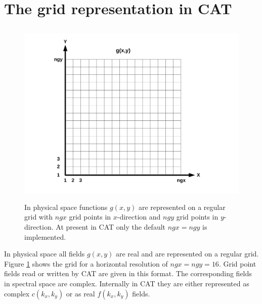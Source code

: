 \section{The grid representation in CAT}
\label{ssec_Grids}
%
\begin{figure}
   \includegraphics[height=9cm]{figures/phys_grid.pdf}
   \caption{In physical space functions $g(x,y)$ are represented on a
            regular grid with $ngx$ grid points in $x$-direction and
            $ngy$ grid points in $y$-direction. At present in CAT only
            the default $ngx = ngy$ is implemented.}
   \label{fig_physgrid}
\end{figure}
In physical space all fields $g(x,y)$ are real and are represented on 
a regular grid. Figure \ref{fig_physgrid} shows the grid for a horizontal
resolution of $ngx = ngy = 16$. Grid point fields read or written by CAT
are given in this format. The corresponding fields in spectral space are 
complex. Internally in CAT they are either represented as complex 
$c(k_{x},k_{y})$ or as real $f(k_{x},k_{y})$ fields.
